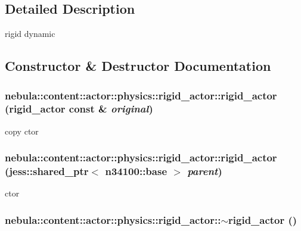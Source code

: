 \subsection{Detailed Description}
rigid dynamic 

\subsection{Constructor \& Destructor Documentation}
\hypertarget{classnebula_1_1content_1_1actor_1_1physics_1_1rigid__actor_a31944793d63a691eb69596c814616dcc}{
\subsubsection[{rigid\_\-actor}]{\setlength{\rightskip}{0pt plus 5cm}nebula::content::actor::physics::rigid\_\-actor::rigid\_\-actor ({\bf rigid\_\-actor} const \& {\em original})}}
\label{classnebula_1_1content_1_1actor_1_1physics_1_1rigid__actor_a31944793d63a691eb69596c814616dcc}


copy ctor \hypertarget{classnebula_1_1content_1_1actor_1_1physics_1_1rigid__actor_a81853ee942594a13d1cff5ffcc3ce28e}{
\subsubsection[{rigid\_\-actor}]{\setlength{\rightskip}{0pt plus 5cm}nebula::content::actor::physics::rigid\_\-actor::rigid\_\-actor (jess::shared\_\-ptr$<$ {\bf n34100::base} $>$ {\em parent})}}
\label{classnebula_1_1content_1_1actor_1_1physics_1_1rigid__actor_a81853ee942594a13d1cff5ffcc3ce28e}


ctor \hypertarget{classnebula_1_1content_1_1actor_1_1physics_1_1rigid__actor_af40b20343dc2657a5a02f61909a9b4b7}{
\subsubsection[{$\sim$rigid\_\-actor}]{\setlength{\rightskip}{0pt plus 5cm}nebula::content::actor::physics::rigid\_\-actor::$\sim$rigid\_\-actor ()}}
\label{classnebula_1_1content_1_1actor_1_1physics_1_1rigid__actor_af40b20343dc2657a5a02f61909a9b4b7}


